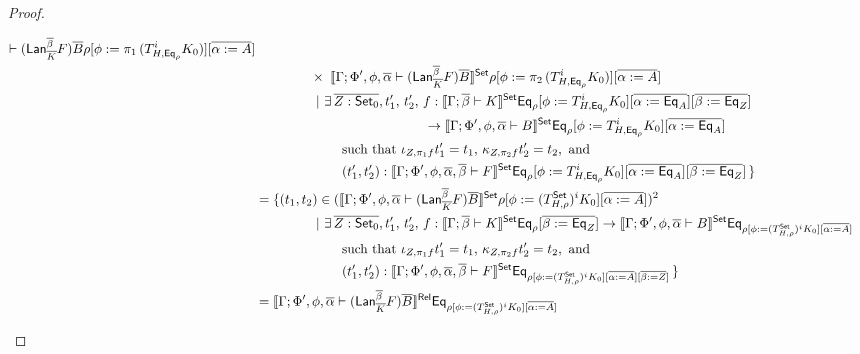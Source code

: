 \documentclass[acmsmall,review,anonymous]{acmart}
\theoremstyle{definition}
\newcommand{\set}{\mathsf{Set}}
\begin{document}
\begin{proof}
\begin{itemize}
\begin{itemize}
{\begin{align*}
{    \vdash (\Lan_{\ol K}^{\ol \beta} F)\ol{B}} \rho [\phi := \pi_1\,
    (T^i_{H,\Eq_{\rho}} K_0)] [\overline{\alpha := A}]\\
& \hspace*{0.57in}\times\;
  \oCPOsem{\Gamma;\Phi',\phi,\ol\alpha \vdash (\Lan_{\ol
      K}^{\ol \beta} F)\ol{B}} \rho [\phi := \pi_2\,
    (T^i_{H,\Eq_{\rho}} K_0)] [\overline{\alpha := A}]\\
  & \hspace*{0.63in}|~\exists\, \ol{Z : \oCPO_0}, t_1',\, t_2',\,
  f : \oCPOsem{\Gamma;\ol\beta \vdash K} \Eq_\rho
  [\phi := T^i_{H,\Eq_{\rho}} K_0] [\overline{\alpha := \Eq_A}]
  [\overline{\beta := \Eq_Z}]\\
  & \hspace*{1.75in}\to \oCPOsem{\Gamma;\Phi',
    \phi,\ol\alpha \vdash B} \Eq_\rho [\phi := T^i_{H,\Eq_{\rho}} K_0]
  [\overline{\alpha := \Eq_A}]\\
  &\hspace{0.9in}\mbox{such that } \iota_{Z,\pi_1 f}t_1' = t_1,\,
  \kappa_{Z,\pi_2 f}t_2' = t_2, \mbox{ and }\\
  &\hspace*{0.9in}(t_1',t_2') : \oCPOsem{\Gamma;\Phi',
    \phi,\ol\alpha,\ol\beta \vdash F} \Eq_\rho [\phi := T^i_{H,\Eq_{\rho}} K_0]
  [\overline{\alpha := \Eq_A}][\ol{\beta :=\Eq_Z}]\,\}\\
&= \{(t_1,t_2) \in (\oCPOsem{\Gamma;\Phi',\phi,\ol\alpha
    \vdash (\Lan_{\ol K}^{\ol \beta} F)\ol{B}} \rho [\phi := 
    (T^\set_{H,{\rho}})^i K_0] [\overline{\alpha := A}])^2\\
  & \hspace*{0.63in}|~\exists\, \ol{Z : \oCPO_0}, t_1',\, t_2',\,
  f : \oCPOsem{\Gamma;\ol\beta \vdash K} \Eq_\rho[\overline{\beta :=
      \Eq_Z}]\to \oCPOsem{\Gamma;\Phi',
    \phi,\ol\alpha \vdash B} \Eq_{\rho[\phi := (T^\set_{H,{\rho}})^i K_0]
  [\overline{\alpha := A}]}\\
  &\hspace{0.9in}\mbox{such that } \iota_{Z,\pi_1 f}t_1' = t_1,\,
  \kappa_{Z,\pi_2 f}t_2' = t_2, \mbox{ and }\\
  &\hspace*{0.9in}(t_1',t_2') : \oCPOsem{\Gamma;\Phi',
    \phi,\ol\alpha,\ol\beta \vdash F} \Eq_{\rho[\phi :=
      (T^\set_{H,{\rho}})^i K_0][\overline{\alpha := A}][\ol{\beta :=Z}]}\,\}\\
 &=\oCPORsem{\Gamma;\Phi',\phi,\ol\alpha
    \vdash (\Lan_{\ol K}^{\ol \beta} F)\ol{B}}  \Eq_{\rho[\phi :=
   (T^\oCPO_{H,\rho})^i K_0] [\overline{\alpha := A}]}\\

\end{align*}}
\end{itemize}
\end{itemize}
\end{proof}
\end{document}
